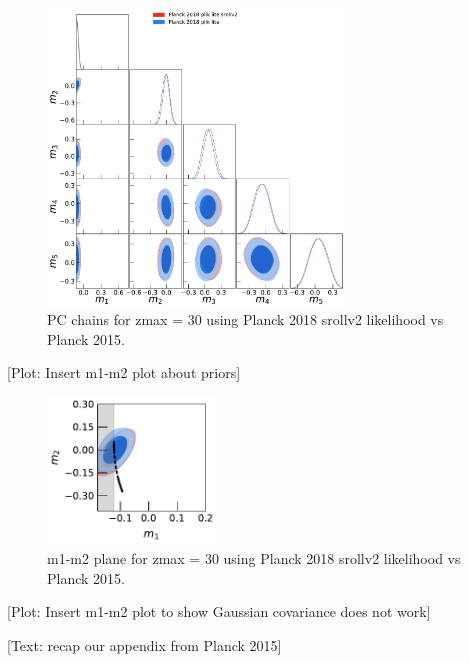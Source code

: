 \documentclass[prd,twocolumn,amsmath,amssymb,floatfix,superscriptaddress,nofootinbib]{revtex4-1}
\begin{document}
\begin{widetext}

\begin{figure}
\includegraphics[width=0.7\textwidth]{results/pc_results/plot_mj_triangle_pl18_pc_zmax30_pliklite_srollv2_vs_pl18_pc_zmax30_pliklite.pdf}
\caption{PC chains for zmax = 30 using Planck 2018 srollv2 likelihood vs Planck 2015.
}
\label{fig:plot_mjs}
\end{figure}

\end{widetext}

[Plot: Insert m1-m2 plot about priors]

\begin{figure}
\includegraphics[width=0.4\textwidth]{results/pc_results/plot_m1_m2_pl18_pc_zmax30_pliklite_srollv2_vs_pl18_pc_zmax30_pliklite_wTauTrajectory.pdf}
\caption{m1-m2 plane for zmax = 30 using Planck 2018 srollv2 likelihood vs Planck 2015.
}
\label{fig:plot_m1m2}
\end{figure}



[Plot: Insert m1-m2 plot to show Gaussian covariance does not work]

[Text: recap our appendix from Planck 2015]
\end{document}
